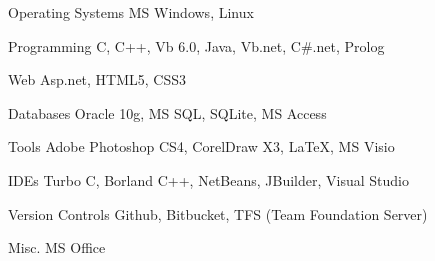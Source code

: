 

\begin{cvskills}
  \cvskill
    {Operating Systems} %
    {MS Windows, Linux} %
    
  \cvskill
    {Programming} %
    {C, C++, Vb 6.0, Java, Vb.net, C\#.net, Prolog} %
    
  \cvskill
    {Web} %
    {Asp.net, HTML5, CSS3} %
    
  \cvskill
    {Databases} %
    {Oracle 10g, MS SQL, SQLite, MS Access} %
    
  \cvskill
    {Tools} %
    {Adobe Photoshop CS4, CorelDraw X3, \LaTeX, MS Visio} %

 \cvskill
    {IDEs} %
    {Turbo C, Borland C++, NetBeans, JBuilder, Visual Studio} %
    
\cvskill
{Version Controls} %
{Github, Bitbucket, TFS (Team Foundation Server)} %
       
\cvskill
{Misc.} %
{MS Office} %

\end{cvskills}
